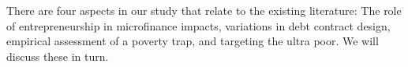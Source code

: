 
	There are four aspects in our study that relate to the existing literature: The role of entrepreneurship in microfinance impacts, variations in debt contract design, empirical assessment of a poverty trap, and targeting the ultra poor. We will discuss these in turn.

